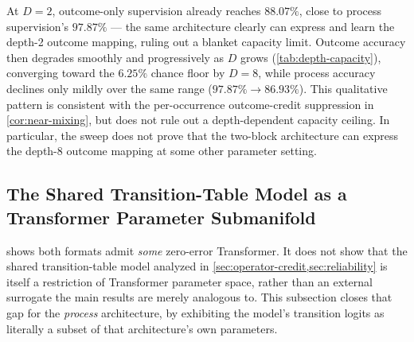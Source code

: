 At $D=2$, outcome-only supervision already reaches $88.07\%$, close to
process supervision's $97.87\%$ --- the same architecture clearly can
express and learn the depth-2 outcome mapping, ruling out a blanket
capacity limit. Outcome accuracy then degrades smoothly and
progressively as $D$ grows (\cref{tab:depth-capacity}), converging toward
the $6.25\%$ chance floor by $D=8$, while process accuracy declines only
mildly over the same range ($97.87\%\to86.93\%$). This qualitative
pattern is consistent with the per-occurrence outcome-credit suppression
in \cref{cor:near-mixing}, but does not rule out a depth-dependent capacity
ceiling. In particular, the sweep does not prove that the two-block
architecture can express the depth-$8$ outcome mapping at some other
parameter setting.

\subsection{The Shared Transition-Table Model as a Transformer Parameter Submanifold}
\label{app:shared-kernel-embedding}

 shows both formats admit \emph{some} zero-error
Transformer. It does not show that the shared transition-table model
analyzed in \cref{sec:operator-credit,sec:reliability} is itself a
restriction of Transformer parameter space, rather than an external
surrogate the main results are merely analogous to. This subsection closes
that gap for the \emph{process} architecture, by exhibiting the model's
transition logits as literally a subset of that architecture's own
parameters.

